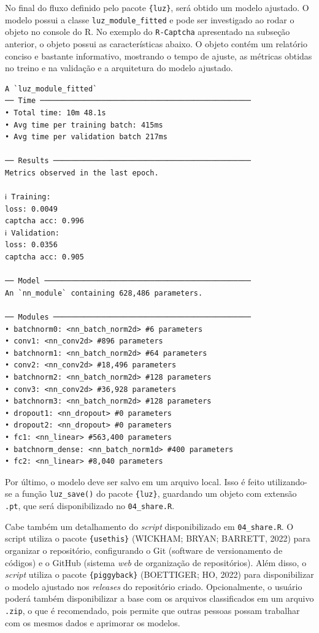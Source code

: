 \documentclass[12pt,twoside,brazilian]{book}
\begin{document}
No final do fluxo definido pelo pacote \texttt{\{luz\}}, será obtido um
modelo ajustado. O modelo possui a classe \texttt{luz\_module\_fitted} e
pode ser investigado ao rodar o objeto no console do R. No exemplo do
\texttt{R-Captcha} apresentado na subseção anterior, o objeto possui as
características abaixo. O objeto contém um relatório conciso e bastante
informativo, mostrando o tempo de ajuste, as métricas obtidas no treino
e na validação e a arquitetura do modelo ajustado.

\begin{verbatim}
A `luz_module_fitted`
── Time ────────────────────────────────────────────────
• Total time: 10m 48.1s
• Avg time per training batch: 415ms
• Avg time per validation batch 217ms

── Results ─────────────────────────────────────────────
Metrics observed in the last epoch.

ℹ Training:
loss: 0.0049
captcha acc: 0.996
ℹ Validation:
loss: 0.0356
captcha acc: 0.905

── Model ───────────────────────────────────────────────
An `nn_module` containing 628,486 parameters.

── Modules ─────────────────────────────────────────────
• batchnorm0: <nn_batch_norm2d> #6 parameters
• conv1: <nn_conv2d> #896 parameters
• batchnorm1: <nn_batch_norm2d> #64 parameters
• conv2: <nn_conv2d> #18,496 parameters
• batchnorm2: <nn_batch_norm2d> #128 parameters
• conv3: <nn_conv2d> #36,928 parameters
• batchnorm3: <nn_batch_norm2d> #128 parameters
• dropout1: <nn_dropout> #0 parameters
• dropout2: <nn_dropout> #0 parameters
• fc1: <nn_linear> #563,400 parameters
• batchnorm_dense: <nn_batch_norm1d> #400 parameters
• fc2: <nn_linear> #8,040 parameters
\end{verbatim}

Por último, o modelo deve ser salvo em um arquivo local. Isso é feito
utilizando-se a função \texttt{luz\_save()} do pacote \texttt{\{luz\}},
guardando um objeto com extensão \texttt{.pt}, que será disponibilizado
no \texttt{04\_share.R}.

Cabe também um detalhamento do \emph{script} disponibilizado em
\texttt{04\_share.R}. O script utiliza o pacote \texttt{\{usethis\}}
(WICKHAM; BRYAN; BARRETT, 2022) para organizar o repositório,
configurando o Git (software de versionamento de códigos) e o GitHub
(sistema \emph{web} de organização de repositórios). Além disso, o
\emph{script} utiliza o pacote \texttt{\{piggyback\}} (BOETTIGER; HO,
2022) para disponibilizar o modelo ajustado nos \emph{releases} do
repositório criado. Opcionalmente, o usuário poderá também
disponibilizar a base com os arquivos classificados em um arquivo
\texttt{.zip}, o que é recomendado, pois permite que outras pessoas
possam trabalhar com os mesmos dados e aprimorar os modelos.
\end{document}
